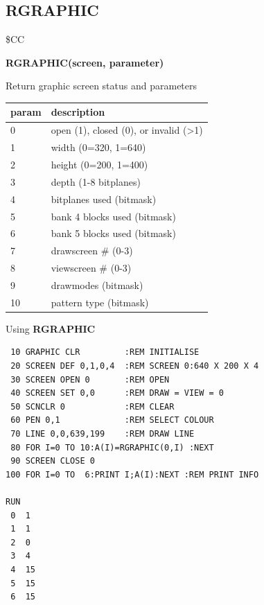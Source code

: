 \subsection{RGRAPHIC}
\begin{description}[leftmargin=2cm,style=nextline]
\item [Token:] \$CC
\item [Format:] {\bf RGRAPHIC(screen, parameter)}
\item [Usage:]  Return graphic screen status and parameters

\begin{center}
\ttfamily
{\setlength{\tabcolsep}{1mm}
\begin{tabular}{|l|l|}
\hline
 param  & description \\
\hline
 0 & open (1), closed (0), or invalid (>1)  \\
 1 & width  (0=320, 1=640)  \\
 2 & height (0=200, 1=400)  \\
 3 & depth (1-8 bitplanes)  \\
 4 & bitplanes used  (bitmask)  \\
 5 & bank 4 blocks used (bitmask)  \\
 6 & bank 5 blocks used (bitmask)  \\
 7 & drawscreen \# (0-3)  \\
 8 & viewscreen \# (0-3)  \\
 9 & drawmodes  (bitmask)  \\
10 & pattern type  (bitmask)  \\
\hline
\end{tabular}
}
\end{center}


\item [Example:] Using {\bf RGRAPHIC}

\begin{tcolorbox}[colback=black,coltext=white]
\verbatimfont{\codefont}
\begin{verbatim}
 10 GRAPHIC CLR         :REM INITIALISE
 20 SCREEN DEF 0,1,0,4  :REM SCREEN 0:640 X 200 X 4
 30 SCREEN OPEN 0       :REM OPEN
 40 SCREEN SET 0,0      :REM DRAW = VIEW = 0
 50 SCNCLR 0            :REM CLEAR
 60 PEN 0,1             :REM SELECT COLOUR
 70 LINE 0,0,639,199    :REM DRAW LINE
 80 FOR I=0 TO 10:A(I)=RGRAPHIC(0,I) :NEXT
 90 SCREEN CLOSE 0
100 FOR I=0 TO  6:PRINT I;A(I):NEXT :REM PRINT INFO

RUN
 0  1
 1  1
 2  0
 3  4
 4  15
 5  15
 6  15
\end{verbatim}
\end{tcolorbox}
\end{description}



